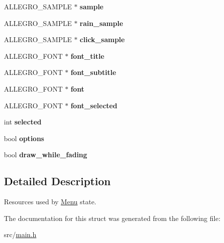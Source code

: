 \begin{DoxyCompactItemize}
\item 
\hypertarget{structMenu_a19a25811d2d08b8fa1d1819088168b72}{\-A\-L\-L\-E\-G\-R\-O\-\_\-\-S\-A\-M\-P\-L\-E $\ast$ {\bfseries sample}}\label{structMenu_a19a25811d2d08b8fa1d1819088168b72}

\item 
\hypertarget{structMenu_ad14705d9172d76dc241de8f4657254cc}{\-A\-L\-L\-E\-G\-R\-O\-\_\-\-S\-A\-M\-P\-L\-E $\ast$ {\bfseries rain\-\_\-sample}}\label{structMenu_ad14705d9172d76dc241de8f4657254cc}

\item 
\hypertarget{structMenu_a012f284df5f9d8e39785a264c736c506}{\-A\-L\-L\-E\-G\-R\-O\-\_\-\-S\-A\-M\-P\-L\-E $\ast$ {\bfseries click\-\_\-sample}}\label{structMenu_a012f284df5f9d8e39785a264c736c506}

\item 
\hypertarget{structMenu_aac0297cac51099ec75020a510a6dcbb3}{\-A\-L\-L\-E\-G\-R\-O\-\_\-\-F\-O\-N\-T $\ast$ {\bfseries font\-\_\-title}}\label{structMenu_aac0297cac51099ec75020a510a6dcbb3}

\item 
\hypertarget{structMenu_a18d7377e798bac336e55e253243d4e13}{\-A\-L\-L\-E\-G\-R\-O\-\_\-\-F\-O\-N\-T $\ast$ {\bfseries font\-\_\-subtitle}}\label{structMenu_a18d7377e798bac336e55e253243d4e13}

\item 
\hypertarget{structMenu_aa4e0229cb315ef9e0ea90263b26a37f8}{\-A\-L\-L\-E\-G\-R\-O\-\_\-\-F\-O\-N\-T $\ast$ {\bfseries font}}\label{structMenu_aa4e0229cb315ef9e0ea90263b26a37f8}

\item 
\hypertarget{structMenu_a577ad17dfddafaae41dde63ca7970003}{\-A\-L\-L\-E\-G\-R\-O\-\_\-\-F\-O\-N\-T $\ast$ {\bfseries font\-\_\-selected}}\label{structMenu_a577ad17dfddafaae41dde63ca7970003}

\item 
\hypertarget{structMenu_a608e2768a5458057048bf1c7ab9a81aa}{int {\bfseries selected}}\label{structMenu_a608e2768a5458057048bf1c7ab9a81aa}

\item 
\hypertarget{structMenu_a239080567caece4982b2edd716c57223}{bool {\bfseries options}}\label{structMenu_a239080567caece4982b2edd716c57223}

\item 
\hypertarget{structMenu_a06eac1cdc4ed5a50be2c34635147e150}{bool {\bfseries draw\-\_\-while\-\_\-fading}}\label{structMenu_a06eac1cdc4ed5a50be2c34635147e150}

\end{DoxyCompactItemize}


\subsection{\-Detailed \-Description}
\-Resources used by \hyperlink{structMenu}{\-Menu} state. 

\-The documentation for this struct was generated from the following file\-:\begin{DoxyCompactItemize}
\item 
src/\hyperlink{main_8h}{main.\-h}\end{DoxyCompactItemize}
